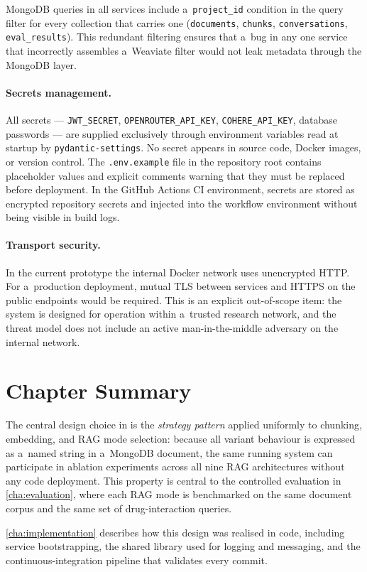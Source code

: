 MongoDB queries in all services include a~\texttt{project\_id} condition
in the query filter for every collection that carries one
(\texttt{documents}, \texttt{chunks}, \texttt{conversations},
\texttt{eval\_results}).  This redundant filtering ensures that a~bug in
any one service that incorrectly assembles a~Weaviate filter would not
leak metadata through the MongoDB layer.

\paragraph{Secrets management.}
All secrets --- \texttt{JWT\_SECRET}, \texttt{OPENROUTER\_API\_KEY},
\texttt{COHERE\_API\_KEY}, database passwords --- are supplied exclusively
through environment variables read at startup by \texttt{pydantic-settings}.
No secret appears in source code, Docker images, or version control.
The \texttt{.env.example} file in the repository root contains placeholder
values and explicit comments warning that they must be replaced before
deployment.  In the GitHub Actions CI environment, secrets are stored as
encrypted repository secrets and injected into the workflow environment
without being visible in build logs.

\paragraph{Transport security.}
In the current prototype the internal Docker network uses unencrypted HTTP.
For a~production deployment, mutual TLS between services and HTTPS on the
public endpoints would be required.  This is an explicit out-of-scope item:
the system is designed for operation within a~trusted research network,
and the threat model does not include an active man-in-the-middle adversary
on the internal network.

\section{Chapter Summary}
\label{sec:design_summary}

The central design choice in \medrag{} is the \emph{strategy pattern} applied uniformly
to chunking, embedding, and RAG mode selection: because all variant behaviour
is expressed as a~named string in a~MongoDB document, the same running system
can participate in ablation experiments across all nine RAG architectures
without any code deployment.  This property is central to the controlled
evaluation in \cref{cha:evaluation}, where each RAG mode is benchmarked on
the same document corpus and the same set of drug-interaction queries.

\cref{cha:implementation} describes how this design was realised in code,
including service bootstrapping, the shared library used for logging and
messaging, and the continuous-integration pipeline that validates every commit.
